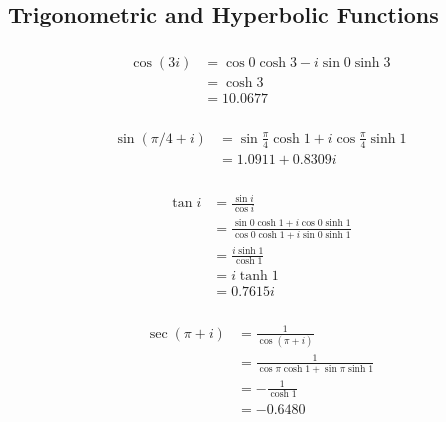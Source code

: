 \documentclass{article}
\begin{document}
\subsection{Trigonometric and Hyperbolic Functions}

\subsubsection{}

\begin{align*}
  \cos (3 i) & = \cos 0 \cosh 3 - i \sin 0 \sinh 3 \\
             & = \cosh 3                           \\
             & = 10.0677
\end{align*}

\setcounter{subsubsection}{2}
\subsubsection{}

\begin{align*}
  \sin (\pi / 4 + i) & = \sin \frac{\pi}{4} \cosh 1 + i \cos \frac{\pi}{4} \sinh 1 \\
                     & = 1.0911 + 0.8309 i
\end{align*}

\setcounter{subsubsection}{4}
\subsubsection{}

\begin{align*}
  \tan i & = \frac{\sin i}{\cos i}                                                       \\
         & = \frac{\sin 0 \cosh 1 + i \cos 0 \sinh 1}{\cos 0 \cosh 1 + i \sin 0 \sinh 1} \\
         & = \frac{i \sinh 1}{\cosh 1}                                                   \\
         & = i \tanh 1                                                                   \\
         & = 0.7615 i
\end{align*}

\setcounter{subsubsection}{6}
\subsubsection{}

\begin{align*}
  \sec (\pi + i) & = \frac{1}{\cos (\pi + i)}                      \\
                 & = \frac{1}{\cos \pi \cosh 1 + \sin \pi \sinh 1} \\
                 & = -\frac{1}{\cosh 1}                            \\
                 & = -0.6480
\end{align*}
\end{document}
